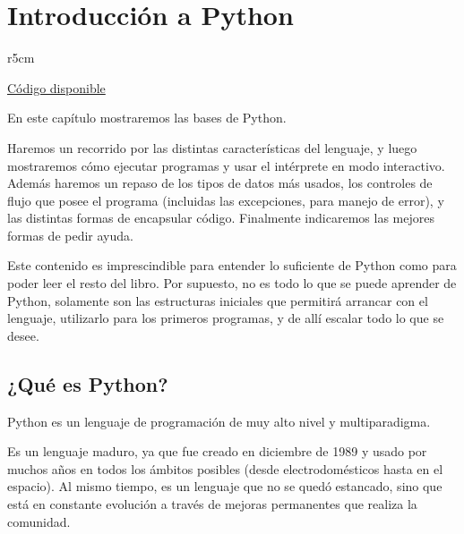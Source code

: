 

\chapter{Introducción a Python} \label{ch:intro}

\begin{wraptable}{r}{5cm}
\begin{modulesinfo}
\begin{center}
{\small
    \href{https://github.com/facundobatista/libro-pyciencia/tree/master/código/py_intro/}{Código disponible}
}
\end{center}
\end{modulesinfo}
\end{wraptable}

En este capítulo mostraremos las bases de Python. 

Haremos un recorrido por las distintas características del lenguaje, y luego mostraremos cómo ejecutar programas y usar el intérprete en modo interactivo. Además haremos un repaso de los tipos de datos más usados, los controles de flujo que posee el programa (incluidas las excepciones, para manejo de error), y las distintas formas de encapsular código. Finalmente indicaremos las mejores formas de pedir ayuda.

Este contenido es imprescindible para entender lo suficiente de Python como para poder leer el resto del libro. Por supuesto, no es todo lo que se puede aprender de Python, solamente son las estructuras iniciales que permitirá arrancar con el lenguaje, utilizarlo para los primeros programas, y de allí escalar todo lo que se desee.


\section{¿Qué es Python?}\label{sec:que-es-python}

Python es un lenguaje de programación de muy alto nivel y multiparadigma.

Es un lenguaje maduro, ya que fue creado en diciembre de 1989 y usado por muchos años en todos los ámbitos posibles (desde electrodomésticos hasta en el espacio). Al mismo tiempo, es un lenguaje que no se quedó estancado, sino que está en constante evolución a través de mejoras permanentes que realiza la comunidad.

